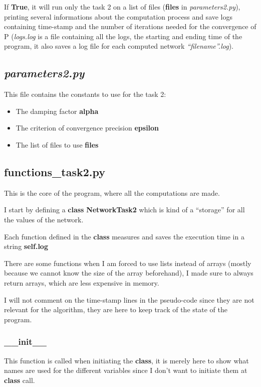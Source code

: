 If \textbf{True}, it will run only the task 2 on a list of files (\textbf{files} in \textit{parameters2.py}), printing several informations about the computation process and save logs containing time-stamp and the number of iterations needed for the convergence of P (\textit{logs.log} is a file containing all the logs, the starting and ending time of the program, it also saves a log file for each computed network \textit{``filename''.log}).

\subsection{\textit{parameters2.py}}
This file contains the constants to use for the task 2:
\begin{itemize}
    \item The damping factor \textbf{alpha}
    \item The criterion of convergence precision \textbf{epsilon}
    \item The list of files to use \textbf{files}
\end{itemize}

\subsection{functions\_task2.py}
This is the core of the program, where all the computations are made.

I start by defining a \textbf{class} \textbf{NetworkTask2} which is kind of a ``storage'' for all the values of the network.

Each function defined in the \textbf{class} measures and saves the execution time in a string \textbf{self.log}

There are some functions when I am forced to use lists instead of arrays (mostly because we cannot know the size of the array beforehand), I made sure to always return arrays, which are less expensive in memory.

I will not comment on the time-stamp lines in the pseudo-code since they are not relevant for the algorithm, they are here to keep track of the state of the program.
\subsubsection{\textbf{\_\_init\_\_}}
This function is called when initiating the \textbf{class}, it is merely here to show what names are used for the different variables since I don't want to initiate them at \textbf{class} call.

